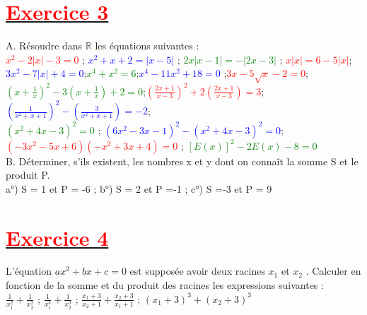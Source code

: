 \documentclass[12pt]{article}
\begin{document}
\section*{\underline{\textbf{\textcolor{red}{Exercice 3}}}}
A. Résoudre dans $\mathbb{R}$ les équations suivantes :\\
\textcolor{red}{$x^{2}-2|x|-3 = 0$} ; \textcolor{blue}{$x^{2}+x+2 = |x-5|$} ;
\textcolor{green}{$2x|x-1| = -|2x-3|$} ; \textcolor{red}{$x|x| = 6 - 5|x|$};\\
\textcolor{blue}{$3x^{2}-7|x|+4 = 0$};\textcolor{green}{$x^{4} + x^{2} = 6$};\textcolor{blue}{$x^{4}-11x^{2}+18 = 0$}  ;\textcolor{red}{$3x-5\sqrt{x}-2 = 0$};\\
\textcolor{green}{$(x+\frac{1}{x})^{2}-3(x+\frac{1}{x})+2=0$};\textcolor{red}{$(\frac{2x+1}{x-3})^{2}+2(\frac{2x+1}{x-3})=3$};\textcolor{blue}{$(\frac{1}{x^{2}+x+1})^{2}-(\frac{3}{x^{2}+x+1})=-2$};\\ \textcolor{green}{$(x^{2}+4x-3)^{2}=0$} ;
\textcolor{blue}{$(6x^{2}-3x-1)^{2}-(x^{2}+4x-3)^{2}=0$};\\ \textcolor{red}{$(-3x^{2}-5x+6)(-x^{2}+3x+4)=0$} ; \textcolor{green}{$[E(x)]^{2}-2E(x)-8 = 0$}\\
B. Déterminer, s’ils existent, les nombres x et y dont on connaît la somme S et
le produit P.\\ a°) S = 1 et P = -6 ; b°) S = 2 et P =-1 ; c°) S =-3 et P = 9\\
\section*{\underline{\textbf{\textcolor{red}{Exercice 4}}}}
L’équation $ax^{2}+bx+c=0$ est supposée avoir deux racines $x_{1}$ et $x_{2}$ . Calculer en
fonction de la somme et du produit des racines les expressions suivantes :\\
$\frac{1}{x_{1}^{2}}+\frac{1}{x_{2}^{2}}$ ; $\frac{1}{x_{1}^{3}}+\frac{1}{x_{2}^{3}}$ ; 
$\frac{x_{1}+3}{x_{2}+1}+\frac{x_{2}+3}{x_{1}+1}$ ; $(x_{1}+3)^{3}+(x_{2}+3)^{3}$
\end{document}
